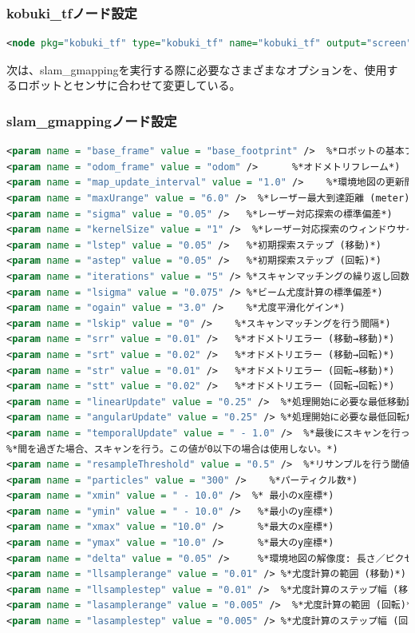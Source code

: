\subsubsection{kobuki\_tfノード設定}

\begin{lstlisting}[language=XML]
<node pkg="kobuki_tf" type="kobuki_tf" name="kobuki_tf" output="screen"> </node>
\end{lstlisting}

次は、slam\_gmappingを実行する際に必要なさまざまなオプションを、使用するロボットとセンサに合わせて変更している。

\subsubsection{slam\_gmappingノード設定}

\begin{lstlisting}[language=XML]
<param name = "base_frame" value = "base_footprint" />  %*ロボットの基本フレーム*)
<param name = "odom_frame" value = "odom" />      %*オドメトリフレーム*)
<param name = "map_update_interval" value = "1.0" />    %*環境地図の更新間隔 (sec)*)
<param name = "maxUrange" value = "6.0" />  %*レーザー最大到達距離 (meter)*)
<param name = "sigma" value = "0.05" />   %*レーザー対応探索の標準偏差*)
<param name = "kernelSize" value = "1" />  %*レーザー対応探索のウィンドウサイズ*)
<param name = "lstep" value = "0.05" />   %*初期探索ステップ (移動)*)
<param name = "astep" value = "0.05" />   %*初期探索ステップ (回転)*)
<param name = "iterations" value = "5" /> %*スキャンマッチングの繰り返し回数*)
<param name = "lsigma" value = "0.075" /> %*ビーム尤度計算の標準偏差*)
<param name = "ogain" value = "3.0" />    %*尤度平滑化ゲイン*)
<param name = "lskip" value = "0" />    %*スキャンマッチングを行う間隔*)
<param name = "srr" value = "0.01" />   %*オドメトリエラー (移動→移動)*)
<param name = "srt" value = "0.02" />   %*オドメトリエラー (移動→回転)*)
<param name = "str" value = "0.01" />   %*オドメトリエラー (回転→移動)*)
<param name = "stt" value = "0.02" />   %*オドメトリエラー (回転→回転)*)
<param name = "linearUpdate" value = "0.25" />  %*処理開始に必要な最低移動距離*)
<param name = "angularUpdate" value = "0.25" /> %*処理開始に必要な最低回転角度*)
<param name = "temporalUpdate" value = " - 1.0" />  %*最後にスキャンを行った時間がこの更新時*)
%*間を過ぎた場合、スキャンを行う。この値が0以下の場合は使用しない。*)
<param name = "resampleThreshold" value = "0.5" />  %*リサンプルを行う閾値*)
<param name = "particles" value = "300" />    %*パーティクル数*)
<param name = "xmin" value = " - 10.0" />  %* 最小のx座標*)
<param name = "ymin" value = " - 10.0" />   %*最小のy座標*)
<param name = "xmax" value = "10.0" />      %*最大のx座標*)
<param name = "ymax" value = "10.0" />      %*最大のy座標*)
<param name = "delta" value = "0.05" />     %*環境地図の解像度: 長さ／ピクセル*)
<param name = "llsamplerange" value = "0.01" /> %*尤度計算の範囲 (移動)*)
<param name = "llsamplestep" value = "0.01" />  %*尤度計算のステップ幅 (移動)*)
<param name = "lasamplerange" value = "0.005" />  %*尤度計算の範囲 (回転)*)
<param name = "lasamplestep" value = "0.005" /> %*尤度計算のステップ幅 (回転)*)
\end{lstlisting}

